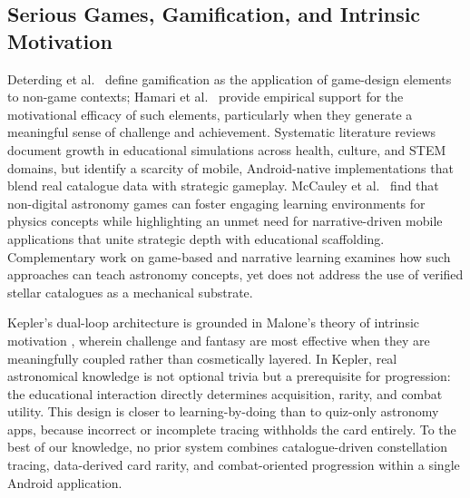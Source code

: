 \documentclass[conference]{IEEEtran}
\begin{document}
\subsection{Serious Games, Gamification, and Intrinsic Motivation}
Deterding et al.\ \cite{deterding2011game} define gamification as the application of game-design elements to non-game contexts; Hamari et al.\ \cite{hamari2014does} provide empirical support for the motivational efficacy of such elements, particularly when they generate a meaningful sense of challenge and achievement. Systematic literature reviews \cite{serious_games_review} document growth in educational simulations across health, culture, and STEM domains, but identify a scarcity of mobile, Android-native implementations that blend real catalogue data with strategic gameplay. McCauley et al.\ \cite{mccauley2025} find that non-digital astronomy games can foster engaging learning environments for physics concepts while highlighting an unmet need for narrative-driven mobile applications that unite strategic depth with educational scaffolding. Complementary work on game-based and narrative learning \cite{starfarer_thesis} examines how such approaches can teach astronomy concepts, yet does not address the use of verified stellar catalogues as a mechanical substrate.

Kepler's dual-loop architecture is grounded in Malone's theory of intrinsic motivation \cite{malone1981toward}, wherein challenge and fantasy are most effective when they are meaningfully coupled rather than cosmetically layered. In Kepler, real astronomical knowledge is not optional trivia but a prerequisite for progression: the educational interaction directly determines acquisition, rarity, and combat utility. This design is closer to learning-by-doing than to quiz-only astronomy apps, because incorrect or incomplete tracing withholds the card entirely. To the best of our knowledge, no prior system combines catalogue-driven constellation tracing, data-derived card rarity, and combat-oriented progression within a single Android application.
\end{document}
